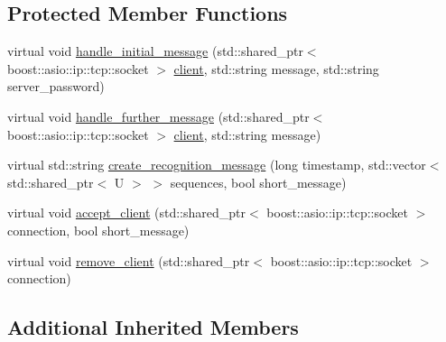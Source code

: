 \subsection*{Protected Member Functions}
\begin{DoxyCompactItemize}
\item 
virtual void \hyperlink{classmae_1_1eventing_1_1server_a528106bf5539bc426074dd74aa601b4a}{handle\-\_\-initial\-\_\-message} (std\-::shared\-\_\-ptr$<$ boost\-::asio\-::ip\-::tcp\-::socket $>$ \hyperlink{classmae_1_1eventing_1_1client}{client}, std\-::string message, std\-::string server\-\_\-password)
\item 
virtual void \hyperlink{classmae_1_1eventing_1_1server_ab866e35c548b06b5dd4b0353fda29537}{handle\-\_\-further\-\_\-message} (std\-::shared\-\_\-ptr$<$ boost\-::asio\-::ip\-::tcp\-::socket $>$ \hyperlink{classmae_1_1eventing_1_1client}{client}, std\-::string message)
\item 
virtual std\-::string \hyperlink{classmae_1_1eventing_1_1server_a7d764a75a113c9dbe41d7cc21300ae4f}{create\-\_\-recognition\-\_\-message} (long timestamp, std\-::vector$<$ std\-::shared\-\_\-ptr$<$ U $>$ $>$ sequences, bool short\-\_\-message)
\item 
virtual void \hyperlink{classmae_1_1eventing_1_1server_a244c1e9b84052e3e745b39a8195550fc}{accept\-\_\-client} (std\-::shared\-\_\-ptr$<$ boost\-::asio\-::ip\-::tcp\-::socket $>$ connection, bool short\-\_\-message)
\item 
virtual void \hyperlink{classmae_1_1eventing_1_1server_a1835468f4fadde7ccbf888a2604f0845}{remove\-\_\-client} (std\-::shared\-\_\-ptr$<$ boost\-::asio\-::ip\-::tcp\-::socket $>$ connection)
\end{DoxyCompactItemize}
\subsection*{Additional Inherited Members}


